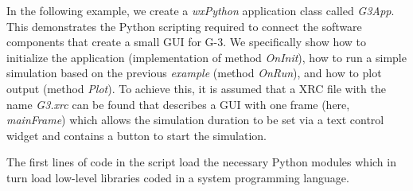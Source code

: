 \documentclass[10pt]{article}
\begin{document}
In the following example, we create a {\it wxPython} application class
called {\it G3App}. This demonstrates the Python scripting required to
connect the software components that create a small GUI for G-3.  We
specifically show how to initialize the application (implementation of
method {\it OnInit}), how to run a simple simulation based on the
previous {\it example} (method {\it OnRun}), and how to plot output
(method {\it Plot}).  To achieve this, it is assumed that a XRC file with the
name {\it G3.xrc} can be found that describes a GUI with one frame
(here, {\it mainFrame}) which allows the simulation duration to be set
via a text control widget and contains a button to start the simulation.

The first lines of code in the script load the necessary Python
modules which in turn load low-level libraries coded in a system
programming language. %
\end{document}
